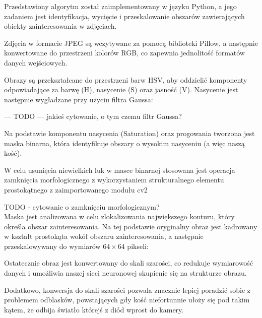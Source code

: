 Przedstawiony algorytm został zaimplementowany w języku Python, a jego zadaniem jest identyfikacja, wycięcie i przeskalowanie obszarów zawierających obiekty zainteresowania w zdjęciach.

Zdjęcia w formacie JPEG są wczytywane za pomocą biblioteki Pillow, a następnie konwertowane do przestrzeni kolorów RGB, co zapewnia jednolitość formatów danych wejściowych.

Obrazy są przekształcane do przestrzeni barw HSV, aby oddzielić komponenty odpowiadające za barwę (H), nasycenie (S) oraz jasność (V).
Nasycenie jest następnie wygładzane przy użyciu filtra Gaussa:

--- TODO ---
jakieś cytowanie, o tym czemu filtr Gaussa?

Na podstawie komponentu nasycenia (Saturation) oraz progowania tworzona jest maska binarna, która identyfikuje obszary o wysokim nasyceniu (a więc naszą kość).

W celu usunięcia niewielkich luk w masce binarnej stosowana jest operacja zamknięcia morfologicznego z wykorzystaniem strukturalnego elementu prostokątnego z zaimportowanego modułu cv2

TODO - cytowanie o zamknięciu morfologicznym?  \\

Maska jest analizowana w celu zlokalizowania największego konturu, który określa obszar zainteresowania.
Na tej podstawie oryginalny obraz jest kadrowany w kształt prostokąta wokół obszaru zainteresowania,
a następnie przeskalowywany do wymiarów $64 \times 64$ pikseli:

Ostatecznie obraz jest konwertowany do skali szarości, co redukuje wymiarowość danych
i umożliwia naszej sieci neuronowej skupienie się na strukturze obrazu.

Dodatkowo, konwersja do skali szarości pozwala znacznie lepiej poradzić sobie z problemem odblasków,
powstających gdy kość niefortunnie ułoży się pod takim kątem, że odbija światło którejś z diód wprost do kamery.


